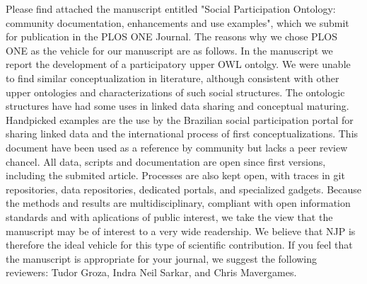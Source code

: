 \documentclass[10pt,stdletter,dateno,sigleft]{newlfm} %
\begin{document}
\begin{newlfm}


	Please find attached the manuscript entitled "Social Participation Ontology: community documentation, enhancements and use examples", which we submit for publication in the PLOS ONE Journal. The reasons why we chose PLOS ONE as the vehicle for our manuscript are as follows.
	In the manuscript we report the development of a participatory upper OWL ontolgy.
	We were unable to find similar conceptualization in literature, although consistent with other upper ontologies and characterizations of such social structures.
	The ontologic structures have had some uses in linked data sharing and conceptual maturing.
	Handpicked examples are the use by the Brazilian social participation portal for sharing linked data
	and the international process of first conceptualizations.
	This document have been used as a reference by community but lacks a peer review chancel.
	All data, scripts and documentation are open since first versions, including the submited article.
	Processes are also kept open, with traces in git repositories, data repositories,
	dedicated portals, and specialized gadgets.
	Because the methods and results are multidisciplinary, compliant with open information standards and with aplications of public interest,
	we take the view that the manuscript may be of interest to a very wide readership.
	 We believe that NJP is therefore the ideal vehicle for this type of scientific contribution.
	 If
	 you feel that the manuscript is appropriate for your journal, we suggest the following reviewers: 
	 Tudor Groza,
	 Indra Neil Sarkar,                                                        and 
	 Chris Mavergames.






\end{newlfm}
\end{document}
